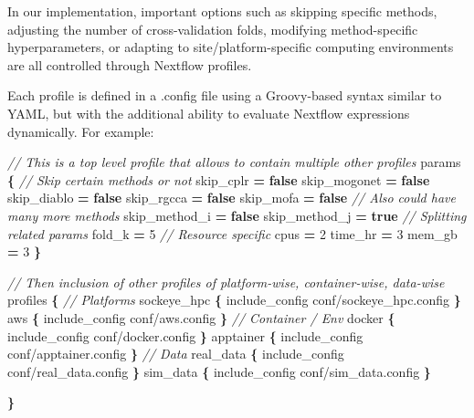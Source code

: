 \documentclass[
]{article}
\newenvironment{Shaded}{\begin{snugshade}}{\end{snugshade}}
\newcommand{\CommentTok}[1]{\textcolor[rgb]{0.56,0.35,0.01}{\textit{#1}}}
\newcommand{\DecValTok}[1]{\textcolor[rgb]{0.00,0.00,0.81}{#1}}
\newcommand{\KeywordTok}[1]{\textcolor[rgb]{0.13,0.29,0.53}{\textbf{#1}}}
\newcommand{\NormalTok}[1]{#1}
\newcommand{\OperatorTok}[1]{\textcolor[rgb]{0.81,0.36,0.00}{\textbf{#1}}}
\newcommand{\StringTok}[1]{\textcolor[rgb]{0.31,0.60,0.02}{#1}}
\begin{document}
In our implementation, important options such as skipping specific methods, adjusting the number of cross-validation folds, modifying method-specific hyperparameters, or adapting to site/platform-specific computing environments are all controlled through Nextflow profiles.

Each profile is defined in a .config file using a Groovy-based syntax similar to YAML, but with the additional ability to evaluate Nextflow expressions dynamically. For example:

\begin{Shaded}
\begin{Highlighting}[]
\CommentTok{// This is a top level profile that allows to contain multiple other profiles}
\NormalTok{params }\OperatorTok{\{}
  \CommentTok{// Skip certain methods or not}
\NormalTok{  skip\_cplr     }\OperatorTok{=} \KeywordTok{false}
\NormalTok{  skip\_mogonet  }\OperatorTok{=} \KeywordTok{false}
\NormalTok{  skip\_diablo   }\OperatorTok{=} \KeywordTok{false}
\NormalTok{  skip\_rgcca    }\OperatorTok{=} \KeywordTok{false}
\NormalTok{  skip\_mofa     }\OperatorTok{=} \KeywordTok{false}
  \CommentTok{// Also could have many more methods}
\NormalTok{  skip\_method\_i }\OperatorTok{=} \KeywordTok{false}
\NormalTok{  skip\_method\_j }\OperatorTok{=} \KeywordTok{true}
  \CommentTok{// Splitting related params}
\NormalTok{  fold\_k        }\OperatorTok{=} \DecValTok{5}
  \CommentTok{// Resource specific}
\NormalTok{  cpus          }\OperatorTok{=} \DecValTok{2}
\NormalTok{  time\_hr       }\OperatorTok{=} \DecValTok{3}
\NormalTok{  mem\_gb        }\OperatorTok{=} \DecValTok{3} 
\OperatorTok{\}}

\CommentTok{// Then inclusion of other profiles of platform{-}wise, container{-}wise, data{-}wise}
\NormalTok{profiles }\OperatorTok{\{}
  \CommentTok{// Platforms}
\NormalTok{  sockeye\_hpc }\OperatorTok{\{}\NormalTok{ include\_config }\StringTok{\textquotesingle{}conf/sockeye\_hpc.config\textquotesingle{}} \OperatorTok{\}}
\NormalTok{  aws         }\OperatorTok{\{}\NormalTok{ include\_config }\StringTok{\textquotesingle{}conf/aws.config\textquotesingle{}}         \OperatorTok{\}}
  \CommentTok{// Container / Env}
\NormalTok{  docker      }\OperatorTok{\{}\NormalTok{ include\_config }\StringTok{\textquotesingle{}conf/docker.config\textquotesingle{}}      \OperatorTok{\}}
\NormalTok{  apptainer   }\OperatorTok{\{}\NormalTok{ include\_config }\StringTok{\textquotesingle{}conf/apptainer.config\textquotesingle{}}   \OperatorTok{\}}
  \CommentTok{// Data}
\NormalTok{  real\_data   }\OperatorTok{\{}\NormalTok{ include\_config }\StringTok{\textquotesingle{}conf/real\_data.config\textquotesingle{}}   \OperatorTok{\}}
\NormalTok{  sim\_data    }\OperatorTok{\{}\NormalTok{ include\_config }\StringTok{\textquotesingle{}conf/sim\_data.config\textquotesingle{}}    \OperatorTok{\}}

\OperatorTok{\}}
\end{Highlighting}
\end{Shaded}
\end{document}
